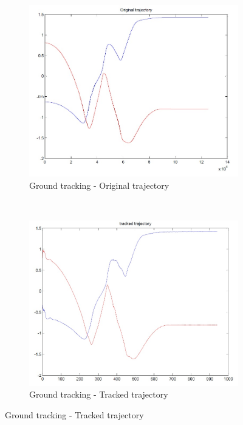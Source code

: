 \begin{figure}[h]
	\centering
	\begin{subfigure}[b]{0.4\linewidth}
		\centering
		\includegraphics[width=\linewidth]{../Images/c3/sim2_traj_ori}
		\caption{Ground tracking - Original trajectory}
		\label{fig:sim2_traj_ori}
	\end{subfigure}
	~
	\begin{subfigure}[b]{0.4\linewidth}
		\centering
		\includegraphics[width=\linewidth]{../Images/c3/sim2_traj_track}
		\caption{Ground tracking - Tracked trajectory}
		\label{fig:sim2_traj_track}
	\end{subfigure}

\end{figure}


